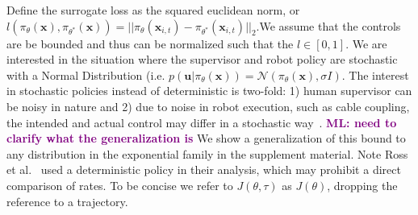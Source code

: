 \documentclass[10pt, conference]{ieeeconf}      %
\newcommand{\bu}{\mathbf{u}}
\newcommand{\bx}{\mathbf{x}}
\newcommand{\mlnote}[1]{\ifthenelse{ \boolean{include-notes}}%
 {\textcolor{purple}{\textbf{ML: #1}}}{}}
\begin{document}
 Define the surrogate loss as the squared euclidean norm, or $l(\pi_{\theta}(\bx),\pi_{\theta^*}(\bx)) = ||\pi_{\theta}(\bx_{i,t}) - \pi_{\theta^*}(\bx_{i,t})||_2$.We assume that the controls are be bounded and thus can be normalized such that the $l \in [0,1]$.  We are interested in the situation where the supervisor and robot policy are stochastic with a Normal Distribution (i.e. $p(\bu|\pi_{\theta}(\bx)) = \mathcal{N}(\pi_\theta(\bx),\sigma I)$. The interest in stochastic policies instead of deterministic is two-fold: 1) human supervisor can be noisy in nature and 2) due to noise in robot execution, such as cable coupling, the intended and actual control may differ in a stochastic way~\cite{mahler2014learning}. \mlnote{need to clarify what the generalization is} We show a generalization of this bound to any distribution in the exponential family in the supplement material.  Note Ross et al.~\cite{ross2010reduction} used a deterministic policy in their analysis, which may prohibit a direct comparison of rates. To be concise we refer to $J(\theta, \tau)$ as $J(\theta)$, dropping the reference to a trajectory.
\end{document}

